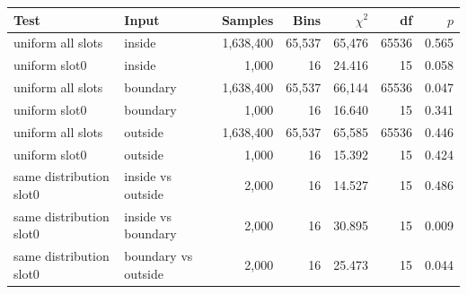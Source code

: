 \begin{tabular}{llrrrrr}
\hline
Test & Input & Samples & Bins & $\chi^2$ & df & $p$ \\
\hline
uniform all slots & inside & 1,638,400 & 65,537 & 65,476 & 65536 & 0.565 \\
uniform slot0 & inside & 1,000 & 16 & 24.416 & 15 & 0.058 \\
uniform all slots & boundary & 1,638,400 & 65,537 & 66,144 & 65536 & 0.047 \\
uniform slot0 & boundary & 1,000 & 16 & 16.640 & 15 & 0.341 \\
uniform all slots & outside & 1,638,400 & 65,537 & 65,585 & 65536 & 0.446 \\
uniform slot0 & outside & 1,000 & 16 & 15.392 & 15 & 0.424 \\
same distribution slot0 & inside vs outside & 2,000 & 16 & 14.527 & 15 & 0.486 \\
same distribution slot0 & inside vs boundary & 2,000 & 16 & 30.895 & 15 & 0.009 \\
same distribution slot0 & boundary vs outside & 2,000 & 16 & 25.473 & 15 & 0.044 \\
\hline
\end{tabular}
